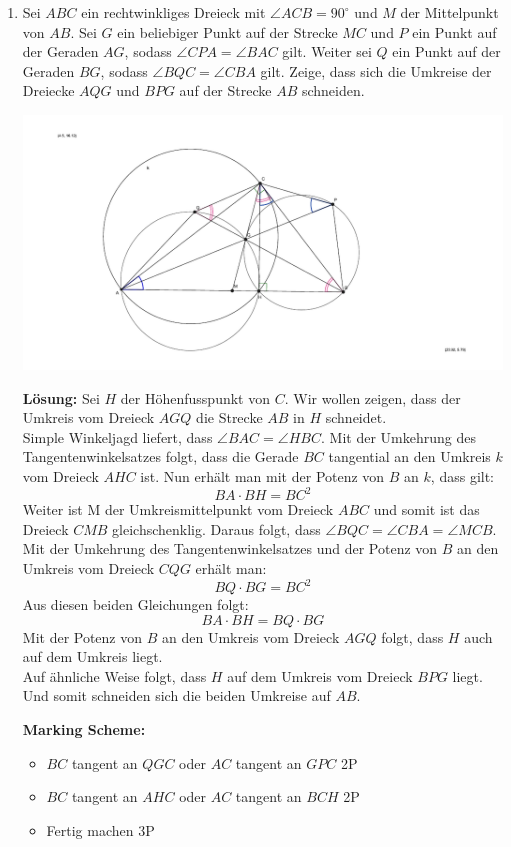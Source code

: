 \documentclass[language=german,style=solution]{smo}
\begin{document}
\begin{enumerate}[label=\textbf{\arabic*.}]
\newpage

\item Sei $ABC$ ein rechtwinkliges Dreieck mit $\angle ACB = 90^\circ$ und $M$ der Mittelpunkt von $AB$. Sei $G$ ein beliebiger Punkt auf der Strecke $MC$ und $P$ ein Punkt auf der Geraden $AG$, sodass $\angle CPA = \angle BAC$ gilt. Weiter sei $Q$ ein Punkt auf der Geraden $BG$, sodass $\angle BQC = \angle CBA$ gilt. Zeige, dass sich die Umkreise der Dreiecke $AQG$ und $BPG$ auf der Strecke $AB$ schneiden.

\includegraphics{finalrunde_5_2016.pdf}

\textbf{Lösung:} Sei $H$ der Höhenfusspunkt von $C$. Wir wollen zeigen, dass der Umkreis vom Dreieck $AGQ$ die Strecke $AB$ in $H$ schneidet.\\
Simple Winkeljagd liefert, dass $\angle BAC = \angle HBC$. Mit der Umkehrung des Tangentenwinkelsatzes folgt, dass die Gerade $BC$ tangential an den Umkreis $k$ vom Dreieck $AHC$ ist. Nun erhält man mit der Potenz von $B$ an $k$, dass gilt:
\[
BA \cdot BH = BC^{2}
\]
Weiter ist M der Umkreismittelpunkt vom Dreieck $ABC$ und somit ist das Dreieck $CMB$ gleichschenklig. Daraus folgt, dass $\angle BQC = \angle CBA = \angle MCB$. Mit der Umkehrung des Tangentenwinkelsatzes und der Potenz von $B$ an den Umkreis vom Dreieck $CQG$ erhält man:
\[
BQ \cdot BG = BC^{2}
\]
Aus diesen beiden Gleichungen folgt:
\[
BA \cdot BH = BQ \cdot BG
\] 
Mit der Potenz von $B$ an den Umkreis vom Dreieck $AGQ$ folgt, dass $H$ auch auf dem Umkreis liegt.\\
Auf ähnliche Weise folgt, dass $H$ auf dem Umkreis vom Dreieck $BPG$ liegt. Und somit schneiden sich die beiden Umkreise auf $AB$.

\textbf{Marking Scheme:} 
\begin{itemize}
\item $BC$ tangent an $QGC$ oder $AC$ tangent an $GPC$ 2P
\item $BC$ tangent an $AHC$ oder $AC$ tangent an $BCH$ 2P
\item Fertig machen 3P
\end{itemize}


\end{enumerate}
\end{document}
